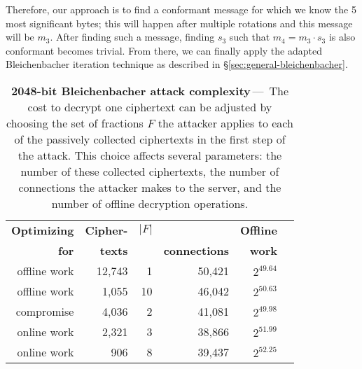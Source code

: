 Therefore, our approach is to find a conformant message for which we know the 5 most significant bytes; this will happen after multiple rotations and
this message will be $m_3$.
After finding such a message, finding $s_3$ such that $m_4 = m_3 \cdot s_3$ is also conformant becomes trivial.
From there, we can finally apply the adapted Bleichenbacher iteration technique as described in \S\ref{sec:general-bleichenbacher}.

\begin{table}[t]
  \centering
	\begin{tabular}{rrrrrr}
	\toprule
	\textbf{Optimizing} & \textbf{Cipher-} & \textbf{$|F|$}     & \textbf{\ssltwo}  & \textbf{Offline} \\
        \textbf{for}        & \textbf{texts}   &           & \textbf{connections} & \textbf{work} \\
	\midrule
	offline work        &           12,743 &          1 &            50,421  & $2^{49.64}$ \\
        offline work        &            1,055 &         10 &              46,042  & $2^{50.63}$ \\
       	compromise          &            4,036 &          2 &              41,081  & $2^{49.98}$ \\
	online work         &            2,321 &          3 &              38,866  & $2^{51.99}$ \\
	online work         &              906 &          8 &              39,437  & $2^{52.25}$ \\
	\bottomrule
	\end{tabular}
		\caption{\textbf{2048-bit Bleichenbacher attack complexity}\,---\,%
		The cost to decrypt one ciphertext can be adjusted by choosing the set of
        fractions $F$ the attacker applies to each of the passively collected
		ciphertexts in the first step of the attack. This choice affects several
		parameters: the number of these collected ciphertexts, the number of
 		connections the attacker makes to the \ssltwo server, and the number of
		offline decryption operations.
		}
        \label{tab:reasonable_parameters}
\end{table}

